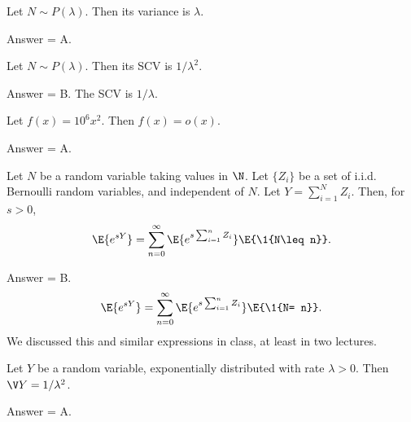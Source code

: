 \begin{exercise}[201902]
Let $N\sim P(\lambda)$. Then its variance is $\lambda$. 

\begin{solution}
Answer = A. %
\end{solution}
\end{exercise}

\begin{exercise}[201902]
Let $N\sim P(\lambda)$. Then its SCV is $1/\lambda^2$. 
\begin{solution}
Answer = B. The SCV is $1/\lambda$. %
\end{solution}
\end{exercise}

\begin{exercise}[201902]
Let $f(x) = 10^6 x^2$. Then $f(x) = o(x)$. 
\begin{solution}
Answer = A.
\end{solution}
\end{exercise}

\begin{exercise}[201902]
 Let $N$ be a random variable taking values in $\N$. Let $\{Z_i\}$ be a set of i.i.d. Bernoulli random variables, and independent of $N$. Let $Y=\sum_{i=1}^N Z_i$. 
 Then, for $s>0$, 
 \begin{equation*}
 \E{e^{sY}} = \sum_{n=0}^\infty \E{e^{s\sum_{i=1}^n Z_i} }\E{\1{N\leq n}}.
 \end{equation*}
\begin{solution} 
Answer = B.
 \begin{equation*}
 \E{e^{sY}} = \sum_{n=0}^\infty \E{e^{s\sum_{i=1}^n Z_i} }\E{\1{N= n}}.
 \end{equation*}
 We discussed this and similar expressions in class, at least in two lectures. 
\end{solution}
\end{exercise}

\begin{exercise}[201902]
Let $Y$ be a random variable, exponentially distributed with rate $\lambda>0$. Then $\V Y = 1/\lambda^2$. 
\begin{solution}
Answer = A. %
\end{solution}
\end{exercise}

